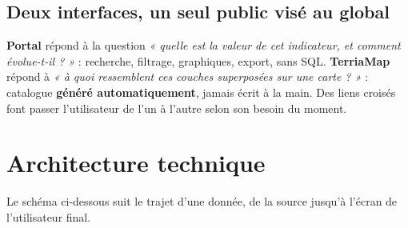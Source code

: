 \documentclass[11pt,a4paper]{article}
\begin{document}
\subsection{Deux interfaces, un seul public visé au global}
\textbf{Portal} répond à la question \emph{« quelle est la valeur de cet indicateur, et comment évolue-t-il ? »} : recherche, filtrage, graphiques, export, sans SQL. \textbf{TerriaMap} répond à \emph{« à quoi ressemblent ces couches superposées sur une carte ? »} : catalogue \textbf{généré automatiquement}, jamais écrit à la main. Des liens croisés font passer l'utilisateur de l'un à l'autre selon son besoin du moment.

\section{Architecture technique}

Le schéma ci-dessous suit le trajet d'une donnée, de la source jusqu'à l'écran de l'utilisateur final.
\end{document}

